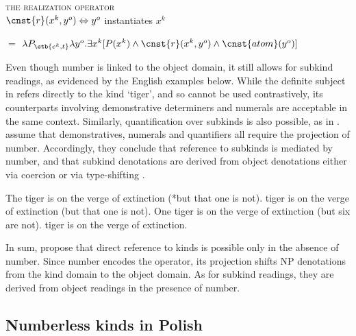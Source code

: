 \documentclass[output=paper]{langscibook}
\begin{document}
\ea \textsc{the realization operator}\label{def:realization_operator}\\
    $\cnst{r}(x^k, y^o) \Leftrightarrow y^o$ instantiates $x^k$




\ex {} $=$ $\lambda P_{\stb{e^k,t}}\lambda y^o.\exists x^k [P(x^k) \wedge \cnst{r}(x^k, y^o) \wedge \cnst{atom}(y^o)]$ \label{ex:number}
\z


\noindent
Even though number is linked to the object domain, it still allows for subkind readings, as evidenced by the English examples below. While the definite subject in  refers directly to the kind `tiger', and so cannot be used contrastively, its counterparts involving demonstrative determiners  and numerals  are acceptable in the same context. Similarly, quantification over subkinds is also possible, as in . \citeauthor{Borik.Espinal2012} assume that demonstratives, numerals and quantifiers all require the projection of number. Accordingly, they conclude that reference to subkinds is mediated by number, and that subkind denotations are derived from object denotations either via coercion \citep{Borik.Espinal2012} or via type-shifting \citep{Borik.Espinal2015}.\largerpage[-1]

\ea
\ea The tiger is on the verge of extinction (*but that one is not). \label{ex:tiger-kind}
 tiger is on the verge of extinction (but that one is not). \label{ex:tiger-dem}
\ex One tiger is on the verge of extinction (but six are not). \label{ex:tiger-num}
 tiger is on the verge of extinction.
\label{ex:tiger-quant}
\z \z

\noindent
In sum, \citeauthor{Borik.Espinal2012} propose that direct reference to kinds is possible only in the absence of number. Since number encodes the  operator, its projection shifts NP denotations from the kind domain to the object domain. As for subkind readings, they are derived from object readings in the presence of number.


\subsection{Numberless kinds in Polish} \label{sec:numberless_kinds_pol}
\end{document}
